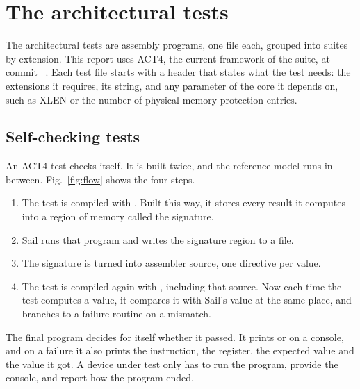 \section{The architectural tests}
\label{sec:tests}

The architectural tests are assembly programs, one file each, grouped
into suites by extension. This report uses ACT4, the current framework
of the suite, at commit \code{\ActCommit}~\cite{act,ctp}. Each test file
starts with a header that states what the test needs: the extensions it
requires, its  string, and any parameter of the core it
depends on, such as XLEN or the number of physical memory protection
entries.

\subsection{Self-checking tests}

An ACT4 test checks itself. It is built twice, and the reference model
runs in between. Fig.~\ref{fig:flow} shows the four steps.

\begin{enumerate}
\item The test is compiled with . Built this way, it
stores every result it computes into a region of memory called the
signature.
\item Sail runs that program and writes the signature region to a file.
\item The signature is turned into assembler source, one 
directive per value.
\item The test is compiled again with ,
including that source. Now each time the test computes a value, it
compares it with Sail's value at the same place, and branches to a
failure routine on a mismatch.
\end{enumerate}

The final program decides for itself whether it passed. It prints
 or  on a console, and on a failure
it also prints the instruction, the register, the expected value and
the value it got. A device under test only has to run the program,
provide the console, and report how the program ended.

